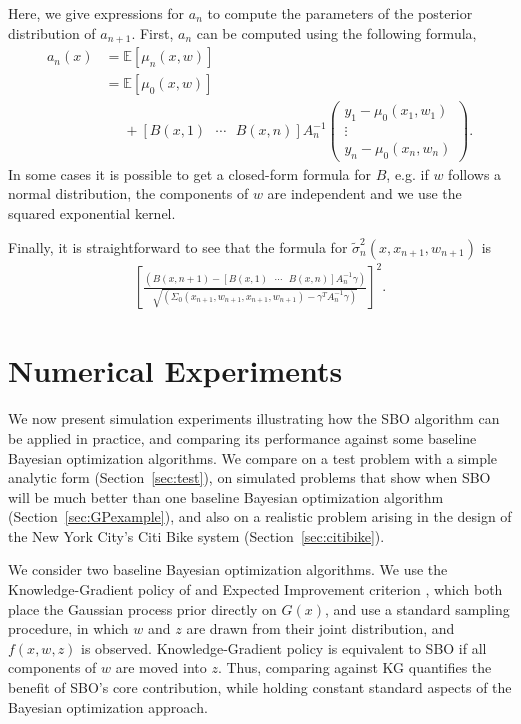 \documentclass{article}
\newcommand{\w}{w}
\newcommand{\z}{z}
\newcommand{\sigmatilde}{\tilde{\sigma}}
\begin{document}
Here, we give expressions for $a_n$  to compute the parameters of the posterior distribution of $a_{n+1}$. First,
$a_{n}$ can be computed using the following formula,
\begin{align*}
a_{n}\left(x\right) &= \mathbb{E}\left[\mu_{n}\left(x,\w\right)\right]\\
 &= \mathbb{E}\left[\mu_{0}\left(x,\w\right)\right]\\
 &\phantom{{}=}+\left[B\left(x,1\right)\mbox{ }\cdots\mbox{ }B\left(x,n\right)\right]A_{n}^{-1}\left(\begin{array}{c}
y_{1}-\mu_{0}\left(x_{1},\w_{1}\right)\\
\vdots\\
y_{n}-\mu_{0}\left(x_{n},\w_{n}\right)
\end{array}\right).
\end{align*}
In some cases it is possible to get a closed-form formula for $B$, e.g. if $\w$ follows a normal distribution, the components of $\w$ are independent and we use the squared exponential kernel.

Finally,  it is straightforward to see that the formula for $\sigmatilde^2_{n}\left(x,x_{n+1},\w_{n+1}\right)$ is
\begin{align*}
\left[\frac{\left(B\left(x,n+1\right)-\left[B\left(x,1\right)\mbox{ }\cdots\mbox{ }B\left(x,n\right)\right]A_{n}^{-1}\gamma\right)}{\sqrt{\left(\Sigma_{0}\left(x_{n+1},\w_{n+1},x_{n+1},\w_{n+1}\right)-\gamma^{T}A_{n}^{-1}\gamma\right)}}\right]^{2}.
\end{align*}

\section{Numerical Experiments}
\label{experiments}

We now present simulation experiments illustrating how the SBO algorithm can be applied in practice, and comparing its performance against some baseline Bayesian optimization algorithms.  We compare on a test problem with a simple analytic form (Section~\ref{sec:test}), on simulated problems that show when SBO will be much better than one baseline Bayesian optimization algorithm (Section~\ref{sec:GPexample}), and also on a realistic problem arising in the design of the New York City's Citi Bike system (Section~\ref{sec:citibike}).

We consider two baseline Bayesian optimization algorithms. We use the Knowledge-Gradient policy of \cite{frazier2009knowledge} and Expected Improvement criterion \cite{jones1998efficient}, which both place the Gaussian process prior directly on $G(x)$, and use a standard sampling procedure, in which $\w$ and $\z$ are drawn from their joint distribution, and $f(x,\w,\z)$ is observed. Knowledge-Gradient policy is equivalent to SBO if all components of $\w$ are moved into $\z$.  Thus, comparing against KG quantifies the benefit of SBO's core contribution, while holding constant standard aspects of the Bayesian optimization approach. 
\end{document}
